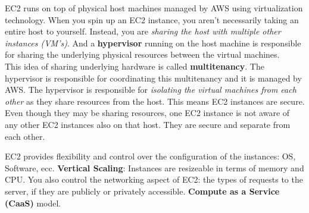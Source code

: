 \documentclass{article}
\theoremstyle{definition}
\begin{document}
EC2 runs on top of physical host machines managed by AWS using virtualization technology. When you spin up an EC2 instance, you aren't necessarily taking an entire host to yourself. Instead, you are \textit{sharing the host with multiple other instances (VM's)}. And a \textbf{hypervisor} running on the host machine is responsible for sharing the underlying physical resources between the virtual machines.\\ This idea of sharing underlying hardware is called \textbf{multitenancy}. The hypervisor is responsible for coordinating this multitenancy and it is managed by AWS. The hypervisor is responsible for \textit{isolating the virtual machines from each other} as they share resources from the host. This means EC2 instances are secure. Even though they may be sharing resources, one EC2 instance is not aware of any other EC2 instances also on that host. They are secure and separate from each other.

EC2 provides flexibility and control over the configuration of the instances: OS, Software, ecc. \textbf{Vertical Scaling}: Instances are resizeable in terms of memory and CPU. You also control the networking aspect of EC2: the types of requests to the server, if they are publicly or privately accessible. \textbf{Compute as a Service (CaaS)} model.
\end{document}
